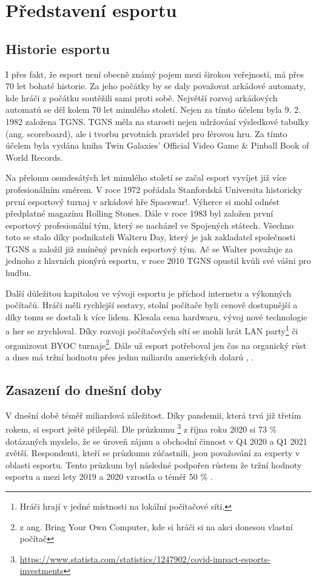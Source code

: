 \chapter{Představení esportu}
\section{Historie esportu}
I přes fakt, že esport není obecně známý pojem mezi širokou veřejností, má přes 70 let bohaté historie. Za jeho počátky by se
daly považovat arkádové automaty, kde hráči z počátku soutěžili sami proti sobě. Největší rozvoj arkádových automatů se děl kolem 70 let minulého 
století. Nejen za tímto účelem byla 9. 2. 1982 založena \ac{TGNS}. \ac{TGNS} měla na starosti nejen udržování výsledkové tabulky (ang. scoreboard),
ale i tvorbu prvotních pravidel pro férovou hru. Za tímto účelem byla vydána kniha Twin Galaxies' Official Video Game \& Pinball Book of World Records.

Na přelomu osmdesátých let minulého století se začal esport vyvíjet již více profesionálním směrem. V roce 1972 pořádala Stanfordská Universita historicky první
esportový turnaj v arkádové hře Spacewar!. Výherce si mohl odnést předplatné magazínu Rolling Stones. Dále v roce 1983 byl založen první esportový profesionální tým,
který se nacházel ve Spojených státech. Všechno toto se stalo díky podnikateli Walteru Day, který je jak zakladatel společnosti \ac{TGNS} a založil již zmíněný
prvních esportový tým. Ač se Walter považuje za jednoho z hlavních pionýrů esportu, v roce 2010 \ac{TGNS} opustil kvůli své vášni pro hudbu.

Další důležitou kapitolou ve vývoji esportu je příchod internetu a výkonných počítačů. Hráči měli rychlejší sestavy, stolní počítače byli cenově dostupnější a díky tomu
se dostali k více lidem. Klesala cena hardwaru, vývoj nové technologie a her se zrychloval. Díky rozvoji počítačových sítí se mohli hrát LAN party\footnote{Hráči hrají v jedné
místnosti na lokální počítačové síti.} či organizovat BYOC turnaje\footnote{z ang. Bring Your Own Computer, kde si hráči si na akci donesou vlastní počítač}. Dále už esport 
potřeboval jen čas na organický růst a dnes má tržní hodnotu přes jednu miliardu amerických dolarů \cite{Gough2021}, \cite{Larch2019}.

\section{Zasazení do dnešní doby}
V dnešní době téměř miliardová záležitost. Díky pandemii, která trvá již třetím rokem, si esport ještě přilepšil. Dle průzkumu
\footnote{\url{https://www.statista.com/statistics/1247902/covid-impact-esports-investments}}
z října roku 2020 si 73 \% dotázaných myslelo, že se úroveň zájmu a obchodní činnost v Q4 2020 a Q1 2021
zvětší. Respondenti, kteří se průzkumu zúčastnili, jsou považování za experty v oblasti esportu. Tento průzkum byl následné podpořen růstem že tržní hodnoty
esportu a mezi lety 2019 a 2020 vzrostla o téměř 50 \% \cite{Gough2021}.

